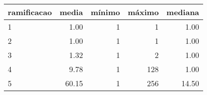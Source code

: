 \begin{table}[ht]
\centering
\begin{tabular}{lrrrr}
  \hline
ramificacao & media & mínimo & máximo & mediana \\ 
  \hline
1 & 1.00 &   1 &   1 & 1.00 \\ 
  2 & 1.00 &   1 &   1 & 1.00 \\ 
  3 & 1.32 &   1 &   2 & 1.00 \\ 
  4 & 9.78 &   1 & 128 & 1.00 \\ 
  5 & 60.15 &   1 & 256 & 14.50 \\ 
   \hline
\end{tabular}
\end{table}
